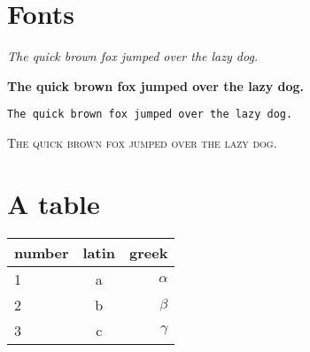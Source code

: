 
\section{Fonts}

\textit{The quick brown fox jumped over the lazy dog.}

\textbf{The quick brown fox jumped over the lazy dog.}

\texttt{The quick brown fox jumped over the lazy dog.}

\textsc{The quick brown fox jumped over the lazy dog.}


\section{A table}

\begin{tabular}{l c r}         \toprule
  number & latin & greek    \\ \midrule
  1      & a     & $\alpha$ \\
  2      & b     & $\beta $ \\
  3      & c     & $\gamma$ \\ \bottomrule
\end{tabular}
